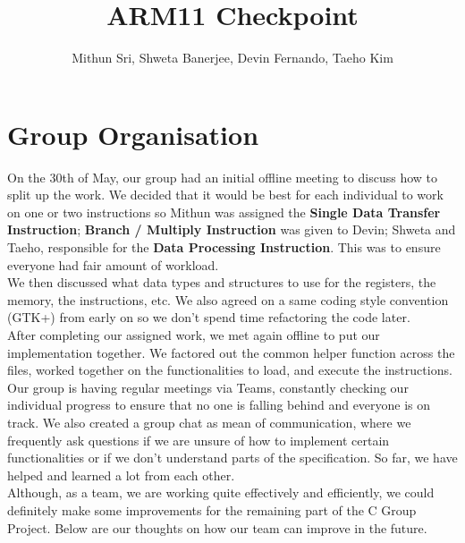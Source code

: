 \documentclass[11pt]{article}
\begin{document}
\title{ARM11 Checkpoint}
\author{Mithun Sri, Shweta Banerjee, Devin Fernando, Taeho Kim}

\maketitle

\section{Group Organisation}


\-\hspace{1cm}On the 30th of May, our group had an initial offline meeting to discuss how to split up the work. We decided that it would be best for each individual to work on one or two instructions so Mithun was assigned the {\bf Single Data Transfer Instruction}; {\bf Branch / Multiply Instruction} was given to Devin; Shweta and Taeho, responsible for the {\bf Data Processing Instruction}. This was to ensure everyone had fair amount of workload. \\
\-\hspace{1cm}We then discussed what data types and structures to use for the registers, the memory, the instructions, etc. We also agreed on a same coding style convention (GTK+) from early on so we don't spend time refactoring the code later. \\
\-\hspace{1cm}After completing our assigned work, we met again offline to put our implementation together. We factored out the common helper function across the files, worked together on the functionalities to load, and execute the instructions. \\
\-\hspace{1cm}Our group is having regular meetings via Teams, constantly checking our individual progress to ensure that no one is falling behind and everyone is on track. We also created a group chat as mean of communication, where we frequently ask questions if we are unsure of how to implement certain functionalities or if we don't understand parts of the specification. So far, we have helped and learned a lot from each other.\\ 
\-\hspace{1cm}Although, as a team, we are working quite effectively and efficiently, we could definitely make some improvements for the remaining part of the C Group Project. Below are our thoughts on how our team can improve in the future.
\end{document}
